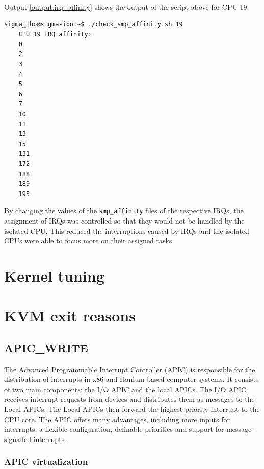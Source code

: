 \documentclass[MMR,Master,english]{twbook}
\begin{document}
Output \ref{output:irq_affinity} shows the output of the script above for CPU 19.

\vspace{1em}
\begin{minipage}{0.95\columnwidth}
\begin{lstlisting}[name={Output of smp_affinity for CPU 19},label={output:irq_affinity}, breaklines=true]
	sigma_ibo@sigma-ibo:~$ ./check_smp_affinity.sh 19
	CPU 19 IRQ affinity:
	0
	2
	3
	4
	5
	6
	7
	10
	11
	13
	15
	131
	172
	188
	189
	195
\end{lstlisting}
\end{minipage}


\noindent By changing the values of the \texttt{smp\_affinity} files of the respective IRQs, the assignment of IRQs was controlled so that they would not be handled by the isolated CPU. This reduced the interruptions caused by IRQs and the isolated CPUs were able to focus more on their assigned tasks.


\section{Kernel tuning}

\clearpage
\section{KVM exit reasons}\label{sec:kvm_exit_reasons}
\subsection{APIC\_WRITE}


The Advanced Programmable Interrupt Controller (APIC) is responsible for the distribution of interrupts in x86 and Itanium-based computer systems. It consists of two main components: the I/O APIC and the local APICs. The I/O APIC receives interrupt requests from devices and distributes them as messages to the Local APICs. The Local APICs then forward the highest-priority interrupt to the CPU core. The APIC offers many advantages, including more inputs for interrupts, a flexible configuration, definable priorities and support for message-signalled interrupts.

\cite{lutsykPipelinedMulticoreMachine2020}

\subsubsection{APIC virtualization}
\end{document}

